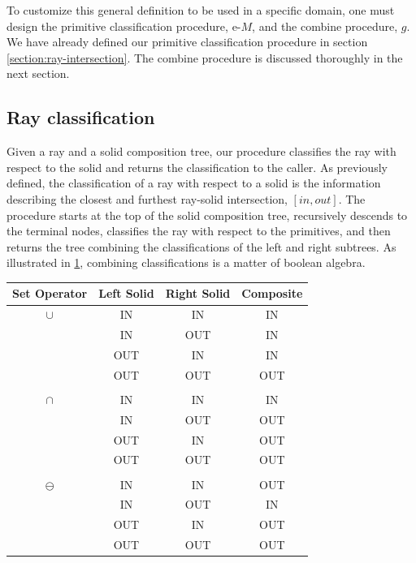 \documentclass[a4paper,11pt,oneside]{article}
\begin{document}
To customize this general definition to be used in a specific domain, one must design the primitive classification procedure, e-$M$, and the combine procedure, $g$. We have already defined our primitive classification procedure in section \ref{section:ray-intersection}. The combine procedure is discussed thoroughly in the next section.

\subsection{Ray classification}

Given a ray and a solid composition tree, our procedure classifies the ray with respect to the solid and returns the classification to the caller. As previously defined, the classification of a ray with respect to a solid is the information describing the closest and furthest ray-solid intersection, $[in, out]$. The procedure starts at the top of the solid composition tree, recursively descends to the terminal nodes, classifies the ray with respect to the primitives, and then returns the tree combining the classifications of the left and right subtrees. As illustrated in \ref{ray-classification:boolean_algebra}, combining classifications is a matter of boolean algebra. \cite{ROTH1982109}

\begin{table}[h]
	\centering
	\label{ray-classification:boolean_algebra}
	\begin{tabular}{||c c c c||} 
		\hline
		Set Operator & Left Solid & Right Solid  & Composite \\ [0.5ex] 
		\hline\hline
		$\cup$    & IN & IN & IN  \\
		    	  & IN & OUT & IN  \\
		    	  & OUT & IN & IN  \\
		 	   	  & OUT & OUT & OUT  \\
		\\
		$\cap$    & IN & IN & IN  \\
		    	  & IN & OUT & OUT  \\
		    	  & OUT & IN & OUT  \\
		 	   	  & OUT & OUT & OUT  \\
		\\
		$\ominus$ & IN & IN & OUT  \\
		    	  & IN & OUT & IN  \\
		    	  & OUT & IN & OUT  \\
		 	   	  & OUT & OUT & OUT  \\		 	   	
		\hline
	\end{tabular}
\end{table}
\end{document}
